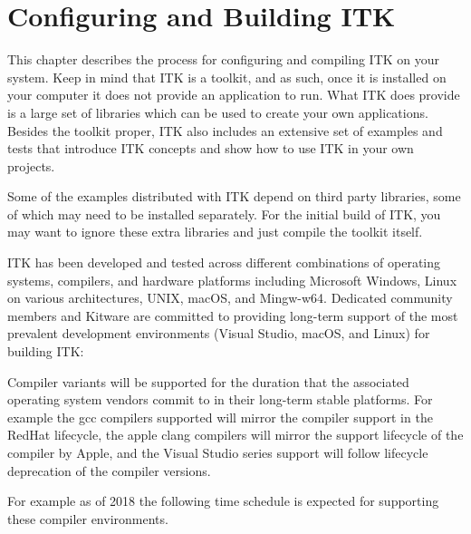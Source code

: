 \chapter{Configuring and Building ITK}
\label{chapter:Installation}

This chapter describes the process for configuring and compiling ITK on your
system. Keep in mind that ITK is a toolkit, and as such, once it is installed
on your computer it does not provide an application to run. What ITK does
provide is a large set of libraries which can be used to create your own
applications. Besides the toolkit proper, ITK also includes an extensive set of
examples and tests that introduce ITK concepts and show how to use ITK in your
own projects.

Some of the examples distributed with ITK depend on third party libraries, some
of which may need to be installed separately. For the initial build of ITK, you
may want to ignore these extra libraries and just compile the toolkit itself.

ITK has been developed and tested across different combinations of operating
systems, compilers, and hardware platforms including Microsoft Windows, Linux on
various architectures, UNIX, macOS, and Mingw-w64. Dedicated community members and
Kitware are committed to providing long-term support of the most prevalent
development environments (Visual Studio, macOS, and Linux) for building ITK:

Compiler variants will be supported for the duration that the associated operating
system vendors commit to in their long-term stable platforms. For example the gcc
compilers supported will mirror the compiler support in the RedHat lifecycle, the
apple clang compilers will mirror the support lifecycle of the compiler by Apple, and
the Visual Studio series support will follow lifecycle deprecation of the compiler
versions.


For example as of 2018 the following time schedule is expected for supporting
these compiler environments.

